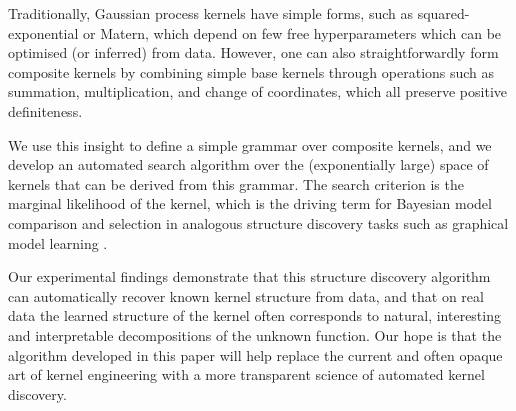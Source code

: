 \documentclass[twoside]{article}
\begin{document}
Traditionally, Gaussian process kernels have simple forms, such as squared-exponential or Matern, which depend on few free hyperparameters which can be optimised (or inferred) from data.
However, one can also straightforwardly form composite kernels by combining simple base kernels through operations such as summation, multiplication, and change of coordinates, which all preserve positive definiteness.

We use this insight to define a simple grammar over composite kernels, and we develop an automated search algorithm over the (exponentially large) space of kernels that can be derived from this grammar.
The search criterion is the marginal likelihood of the kernel, which is the driving term for Bayesian model comparison and selection in analogous structure discovery tasks such as graphical model learning \cite{heckerman1995learning}.


Our experimental findings demonstrate that this structure discovery algorithm can automatically recover known kernel structure from data, and that on real data the learned structure of the kernel often corresponds to natural, interesting and interpretable decompositions of the unknown function.
Our hope is that the algorithm developed in this paper will help replace the current and often opaque art of kernel engineering with a more transparent science of automated kernel discovery.
\end{document}
